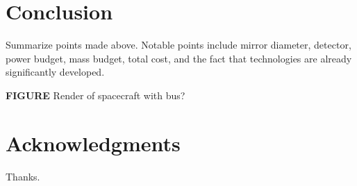 \documentclass{ws-jai}
\begin{document}
%
%
%
%
%

\section{Conclusion}
\label{sec:conclusion}
Summarize points made above. Notable points include mirror diameter, detector, power budget, mass budget, total cost, and the fact that technologies are already significantly developed.

\textbf{FIGURE} Render of spacecraft with bus?

\section*{Acknowledgments}
Thanks.


\end{document}

